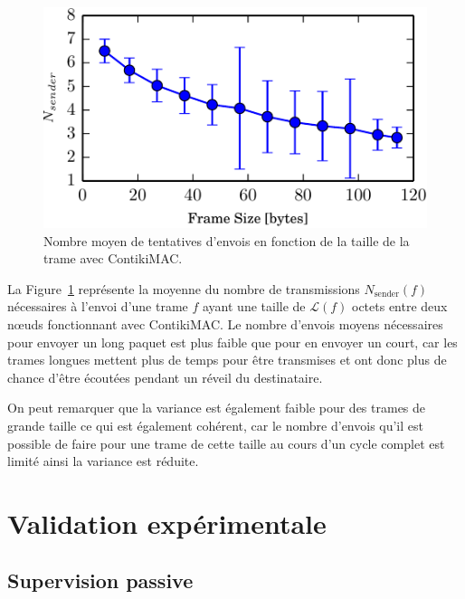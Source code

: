 \begin{figure}[h]
  \centering
  \includegraphics[width=.5\textwidth]{img/average_strobbing-crop.pdf}
  \caption{Nombre moyen de tentatives d'envois en fonction de la taille de la trame avec ContikiMAC.}
  \label{supervision:fig:average_strobing}
\end{figure}

La Figure~\ref{supervision:fig:average_strobing} représente la moyenne du nombre de transmissions $N_{\textrm{sender}}(f)$ nécessaires à l'envoi d'une trame $f$ ayant une taille de $\mathcal{L}(f)$ octets entre deux nœuds fonctionnant avec ContikiMAC.
Le nombre d'envois moyens nécessaires pour envoyer un long paquet est plus faible que pour en envoyer un court, car les trames longues mettent plus de temps pour être transmises et ont donc plus de chance d'être écoutées pendant un réveil du destinataire.

On peut remarquer que la variance est également faible pour des trames de grande taille ce qui est également cohérent, car le nombre d'envois qu'il est possible de faire pour une trame de cette taille au cours d'un cycle complet est limité ainsi la variance est réduite. 

\section{Validation expérimentale}
\label{supervision:validation}

\subsection{Supervision passive}
\label{supervision:chain_results}

